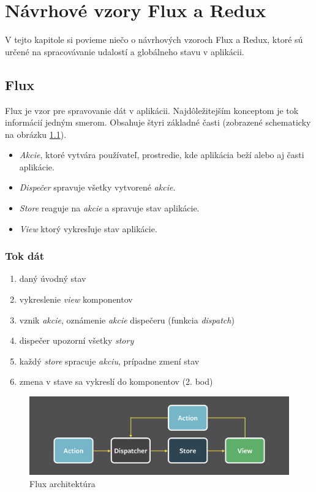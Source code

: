 \chapter{Návrhové vzory Flux a Redux}

\label{kap:vzory} %

V tejto kapitole si povieme niečo o návrhových vzoroch Flux a Redux, ktoré sú určené na spracovávanie udalostí a globálneho stavu v aplikácii.

\section{Flux}
\label{sec:flux}
Flux \cite[Overview]{Flux} je vzor pre spravovanie dát v aplikácii. Najdôležitejším konceptom je tok informácií jedným smerom. Obsahuje štyri základné časti (zobrazené schematicky na obrázku \ref{obr:flux}). 
\begin{itemize}
\item \emph{Akcie}, ktoré vytvára používateľ, prostredie, kde aplikácia beží alebo aj časti aplikácie. 
\item \emph{Dispečer} spravuje všetky vytvorené \emph{akcie}. 
\item \emph{Store} reaguje na \emph{akcie} a spravuje stav aplikácie.
\item \emph{View} ktorý vykresľuje stav aplikácie.
\end{itemize}

\subsection{Tok dát}
\begin{enumerate}
\item daný úvodný stav
\item vykreslenie \emph{view} komponentov
\item vznik \emph{akcie}, oznámenie \emph{akcie} dispečeru (funkcia \emph{dispatch})
\item dispečer upozorní všetky \emph{story}
\item každý \emph{store} spracuje \emph{akciu}, prípadne zmení stav
\item zmena v stave sa vykreslí do komponentov (2. bod)
\end{enumerate}

\begin{figure}
  \centering
    \includegraphics[width=\textwidth]{./images/flux.png}
  \caption{Flux architektúra \cite{FluxObr}}\label{obr:flux}
\end{figure}

